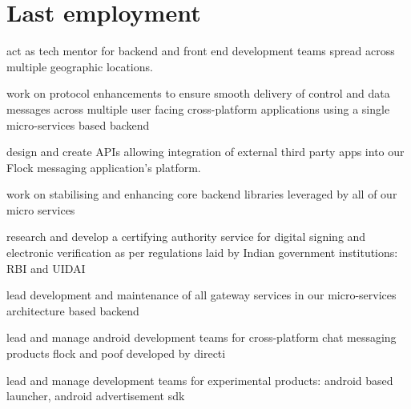 \begin{minipage}[t]{0.66\textwidth} %


\section{Last employment}

\vspace{\topsep} %
\begin{tightitemize}
\item act as tech mentor for backend and front end development teams spread across multiple geographic locations.
\item work on protocol enhancements to ensure smooth delivery of control and data messages across multiple user facing cross-platform applications using a single micro-services based backend
\item design and create APIs allowing integration of external third party apps into our Flock messaging application's platform.
\item work on stabilising and enhancing core backend libraries leveraged by all of our micro services
\end{tightitemize}

\sectionspace %


\begin{tightitemize}
\item research and develop a certifying authority service for digital signing and electronic verification as per regulations laid by Indian government institutions: RBI and UIDAI
\item lead development and maintenance of all gateway services in our micro-services architecture based backend
\end{tightitemize}

\sectionspace %


\begin{tightitemize}
\item lead and manage android development teams for cross-platform chat messaging products flock and poof developed by directi
\item lead and manage development teams for experimental products: android based launcher, android advertisement sdk
\end{tightitemize}


\end{minipage}
